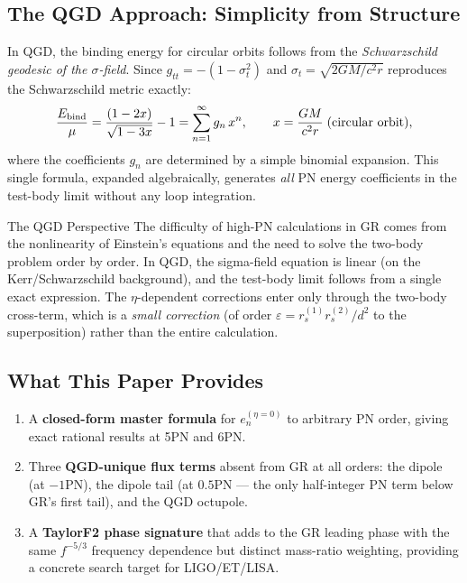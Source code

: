 \documentclass[11pt,a4paper]{article}
\theoremstyle{definition}
\theoremstyle{remark}
\begin{document}
	\subsection{The QGD Approach: Simplicity from Structure}
	
	In QGD, the binding energy for circular orbits follows from the
	\emph{Schwarzschild geodesic of the $\sigma$-field}.  Since
	$g_{tt}=-(1-\sigma_t^2)$ and $\sigma_t=\sqrt{2GM/c^2r}$ reproduces
	the Schwarzschild metric exactly:
	\begin{equation}
		\frac{E_{\rm bind}}{\mu}
		= \frac{(1-2x)}{\sqrt{1-3x}} - 1
		= \sum_{n=1}^\infty g_n\,x^n,
		\qquad x=\frac{GM}{c^2 r}\;\text{(circular orbit)},
		\label{eq:schw_exact}
	\end{equation}
	where the coefficients $g_n$ are determined by a simple binomial
	expansion.  This single formula, expanded algebraically, generates
	\emph{all} PN energy coefficients in the test-body limit without
	any loop integration.
	
	The QGD Perspective
		The difficulty of high-PN calculations in GR comes from the nonlinearity
		of Einstein's equations and the need to solve the two-body problem order
		by order.  In QGD, the sigma-field equation is linear (on the
		Kerr/Schwarzschild background), and the test-body limit follows from a
		single exact expression.  The $\eta$-dependent corrections enter only
		through the two-body cross-term, which is a \emph{small correction} (of
		order $\varepsilon=r_s^{(1)}r_s^{(2)}/d^2$ to the superposition) rather
		than the entire calculation.
	
	\subsection{What This Paper Provides}
	
	\begin{enumerate}
		\item A \textbf{closed-form master formula} for $e_n^{(\eta=0)}$
		to arbitrary PN order, giving exact rational results at 5PN and 6PN.
		\item Three \textbf{QGD-unique flux terms} absent from GR at all orders:
		the dipole (at $-1$PN), the dipole tail (at $0.5$PN — the only
		half-integer PN term below GR's first tail), and the QGD octupole.
		\item A \textbf{TaylorF2 phase signature} that adds to the GR leading
		phase with the same $f^{-5/3}$ frequency dependence but distinct
		mass-ratio weighting, providing a concrete search target for
		LIGO/ET/LISA.
	\end{enumerate}
	
\end{document}
